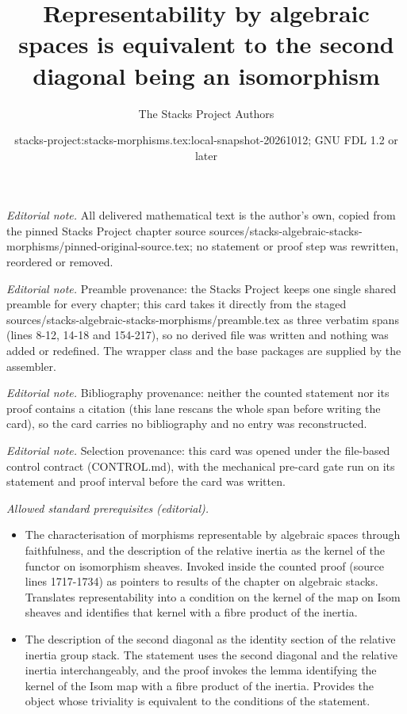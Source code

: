 \documentclass[10pt,a4paper]{amsart}
\title{Representability by algebraic spaces is equivalent to the second diagonal being an isomorphism}
\author{The Stacks Project Authors}
\date{stacks-project:stacks-morphisms.tex:local-snapshot-20261012; GNU FDL 1.2 or later}
\theoremstyle{plain}
\theoremstyle{definition}
\theoremstyle{remark}
\numberwithin{equation}{subsection}
\begin{document}
\maketitle
\noindent\textit{Editorial note.} All delivered mathematical text is the author's own, copied from the pinned Stacks Project chapter source sources/stacks-algebraic-stacks-morphisms/pinned-original-source.tex; no statement or proof step was rewritten, reordered or removed.\par\medskip
\noindent\textit{Editorial note.} Preamble provenance: the Stacks Project keeps one single shared preamble for every chapter; this card takes it directly from the staged sources/stacks-algebraic-stacks-morphisms/preamble.tex as three verbatim spans (lines 8-12, 14-18 and 154-217), so no derived file was written and nothing was added or redefined. The wrapper class and the base packages are supplied by the assembler.\par\medskip
\noindent\textit{Editorial note.} Bibliography provenance: neither the counted statement nor its proof contains a citation (this lane rescans the whole span before writing the card), so the card carries no bibliography and no entry was reconstructed.\par\medskip
\noindent\textit{Editorial note.} Selection provenance: this card was opened under the file-based control contract (CONTROL.md), with the mechanical pre-card gate run on its statement and proof interval before the card was written.\par\medskip
\noindent\textit{Allowed standard prerequisites (editorial).}\begin{itemize}
\item The characterisation of morphisms representable by algebraic spaces through faithfulness, and the description of the relative inertia as the kernel of the functor on isomorphism sheaves. Invoked inside the counted proof (source lines 1717-1734) as pointers to results of the chapter on algebraic stacks. Translates representability into a condition on the kernel of the map on Isom sheaves and identifies that kernel with a fibre product of the inertia.
\item The description of the second diagonal as the identity section of the relative inertia group stack. The statement uses the second diagonal and the relative inertia interchangeably, and the proof invokes the lemma identifying the kernel of the Isom map with a fibre product of the inertia. Provides the object whose triviality is equivalent to the conditions of the statement.
\end{itemize}\medskip
\end{document}
